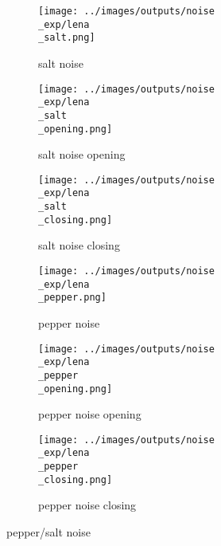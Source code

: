 \begin{figure}[!ht]
   \centering
\begin{subfigure}[t]{0.25\textwidth}
    \texttt{[image: ../images/outputs/noise\\\_exp/lena\\\_salt.png]}
    \caption{salt noise}
    \centering
  \end{subfigure}
\begin{subfigure}[t]{0.25\textwidth}
    \texttt{[image: ../images/outputs/noise\\\_exp/lena\\\_salt\\\_opening.png]}
    \caption{salt noise opening}
    \centering
  \end{subfigure}
\begin{subfigure}[t]{0.25\textwidth}
    \texttt{[image: ../images/outputs/noise\\\_exp/lena\\\_salt\\\_closing.png]}
    \caption{salt noise closing}
    \centering
  \end{subfigure}
\begin{subfigure}[t]{0.25\textwidth}
    \texttt{[image: ../images/outputs/noise\\\_exp/lena\\\_pepper.png]}
    \caption{pepper noise}
    \centering
  \end{subfigure}
\begin{subfigure}[t]{0.25\textwidth}
    \texttt{[image: ../images/outputs/noise\\\_exp/lena\\\_pepper\\\_opening.png]}
    \caption{pepper noise opening}
    \centering
  \end{subfigure}
\begin{subfigure}[t]{0.25\textwidth}
    \texttt{[image: ../images/outputs/noise\\\_exp/lena\\\_pepper\\\_closing.png]}
    \caption{pepper noise closing}
    \centering
  \end{subfigure}
 \caption{pepper/salt noise}
 \end{figure}
